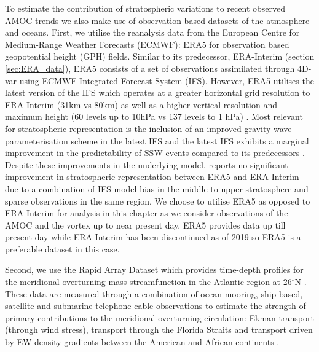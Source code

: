 To estimate the contribution of stratospheric variations to recent observed AMOC trends we also make use of observation based datasets of the atmosphere and oceans. First, we utilise the reanalysis data from the European Centre for Medium-Range Weather Forecasts (ECMWF): ERA5 \citep{hersbachERA52020} for observation based geopotential height (GPH) fields. Similar to its predecessor, ERA-Interim (section \ref{sec:ERA_data}), ERA5 consists of a set of observations assimilated through 4D-var using ECMWF Integrated Forecast System (IFS). However, ERA5 utilises the latest version of the IFS which operates at a greater horizontal grid resolution to ERA-Interim (31km vs 80km) as well as a higher vertical resolution and maximum height (60 levels up to 10hPa vs 137 levels to 1 hPa) \citep{hersbachERA52020}. Most relevant for stratospheric representation is the inclusion of an improved gravity wave parameterisation scheme in the latest IFS and the latest IFS exhibits a marginal improvement in the predictability of SSW events compared to its predecessors \citep{orrImproved2010}. Despite these improvements in the underlying model, \cite{hersbachERA52020} reports no significant improvement in stratospheric representation between ERA5 and ERA-Interim due to a combination of IFS model bias in the middle to upper stratosphere and sparse observations in the same region. We choose to utilise ERA5 as opposed to ERA-Interim for analysis in this chapter as we consider observations of the AMOC and the vortex up to near present day. ERA5 provides data up till present day while ERA-Interim has been discontinued as of 2019 so ERA5 is a preferable dataset in this case. 

Second, we use the Rapid Array Dataset which provides time-depth profiles for the meridional overturning mass streamfunction in the Atlantic region at 26$^{\circ}$N \citep{moatAtlantic2020}. These data are measured through a combination of ocean mooring, ship based, satellite and submarine telephone cable observations to estimate the strength of primary contributions to the meridional overturning circulation: Ekman transport (through wind stress), transport through the Florida Straits and transport driven by EW density gradients between the American and African continents \citep{mccarthyMeasuring2015}.

